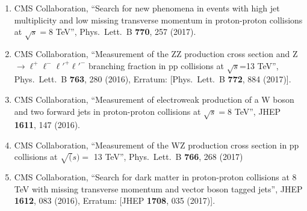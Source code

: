 \begin{enumerate}
\item CMS Collaboration, ``Search for new phenomena in events with high jet multiplicity and low missing transverse momentum in proton-proton collisions at $\sqrt{s}=8$ TeV'', Phys.\ Lett.\ B {\bf 770}, 257 (2017).
  
\item CMS Collaboration, ``Measurement of the ZZ production cross section and Z $\to \ell^+\ell^-\ell'^+\ell'^-$ branching fraction in pp collisions at $\sqrt s$=13 TeV'', Phys.\ Lett.\ B {\bf 763}, 280 (2016), Erratum: [Phys.\ Lett.\ B {\bf 772}, 884 (2017)].

\item CMS Collaboration, ``Measurement of electroweak production of a W boson and two forward jets in proton-proton collisions at $ \sqrt{s}=8 $ TeV'', JHEP {\bf 1611}, 147 (2016).

\item CMS Collaboration, ``Measurement of the WZ production cross section in pp collisions at $\sqrt(s) =$ 13 TeV'', Phys.\ Lett.\ B {\bf 766}, 268 (2017)

\item CMS Collaboration, ``Search for dark matter in proton-proton collisions at 8 TeV with missing transverse momentum and vector boson tagged jets'', JHEP {\bf 1612}, 083 (2016), Erratum: [JHEP {\bf 1708}, 035 (2017)].


\end{enumerate}
